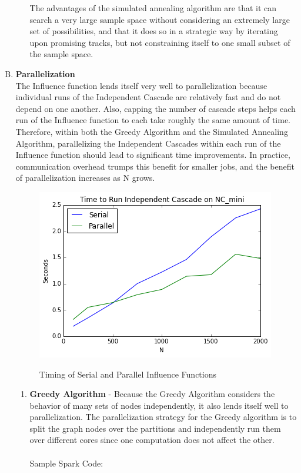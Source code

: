 \documentclass[11pt]{scrartcl} %
\begin{document}
\begin{enumerate}[A)]
\begin{enumerate}[i.]
The advantages of the simulated annealing algorithm are that it can search a very large sample space without considering an extremely large set of possibilities, and that it does so in a strategic way by iterating upon promising tracks, but not constraining itself to one small subset of the sample space.  \\
\end{enumerate}

\item \textbf {Parallelization}\\

The Influence function lends itself very well to parallelization because individual runs of the Independent Cascade are relatively fast and do not depend on one another.  Also, capping the number of cascade steps helps each run of the Influence function to each take roughly the same amount of time.  Therefore, within both the Greedy Algorithm and the Simulated Annealing Algorithm, parallelizing the Independent Cascades within each run of the Influence function should lead to significant time improvements.  In practice, communication overhead trumps this benefit for smaller jobs, and the benefit of parallelization increases as N grows.

\begin{figure}
\centering
\includegraphics[width=10 cm]{TimingSerialParallel}
\label{fig_sim}
\caption{Timing of Serial and Parallel Influence Functions}
\label{fig:LR}
\end{figure}

\begin{enumerate}
\item \textbf{Greedy Algorithm} -
Because the Greedy Algorithm considers the behavior of many sets of nodes independently, it also lends itself well to parallelization.  The parallelization strategy for the Greedy algorithm is to split the graph nodes over the partitions and independently run them over different cores since one computation does not affect the other.\\
\\
Sample Spark Code:\\


\end{enumerate}
\end{enumerate}
\end{document}

